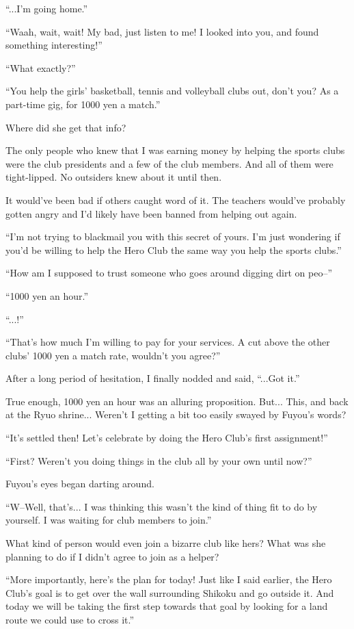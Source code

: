``...I'm going home.''

``Waah, wait, wait! My bad, just listen to me! I looked into you, and found something interesting!''

``What exactly?''

``You help the girls' basketball, tennis and volleyball clubs out, don't you? As a part-time gig, for 1000 yen a match.''

Where did she get that info?

The only people who knew that I was earning money by helping the sports clubs were the club presidents and a few of the club members. And all of them were tight-lipped. No outsiders knew about it until then.

It would've been bad if others caught word of it. The teachers would've probably gotten angry and I'd likely have been banned from helping out again.

``I'm not trying to blackmail you with this secret of yours. I'm just wondering if you'd be willing to help the Hero Club the same way you help the sports clubs.''

``How am I supposed to trust someone who goes around digging dirt on peo--''

``1000 yen an hour.''

``...!''

``That's how much I'm willing to pay for your services. A cut above the other clubs' 1000 yen a match rate, wouldn't you agree?''

After a long period of hesitation, I finally nodded and said, ``...Got it.''

True enough, 1000 yen an hour was an alluring proposition. But... This, and back at the Ryuo shrine... Weren't I getting a bit too easily swayed by Fuyou's words?

``It's settled then! Let's celebrate by doing the Hero Club's first assignment!''

``First? Weren't you doing things in the club all by your own until now?''

Fuyou's eyes began darting around.

``W--Well, that's... I was thinking this wasn't the kind of thing fit to do by yourself. I was waiting for club members to join.''

What kind of person would even join a bizarre club like hers? What was she planning to do if I didn't agree to join as a helper?

``More importantly, here's the plan for today! Just like I said earlier, the Hero Club's goal is to get over the wall surrounding Shikoku and go outside it. And today we will be taking the first step towards that goal by looking for a land route we could use to cross it.''

